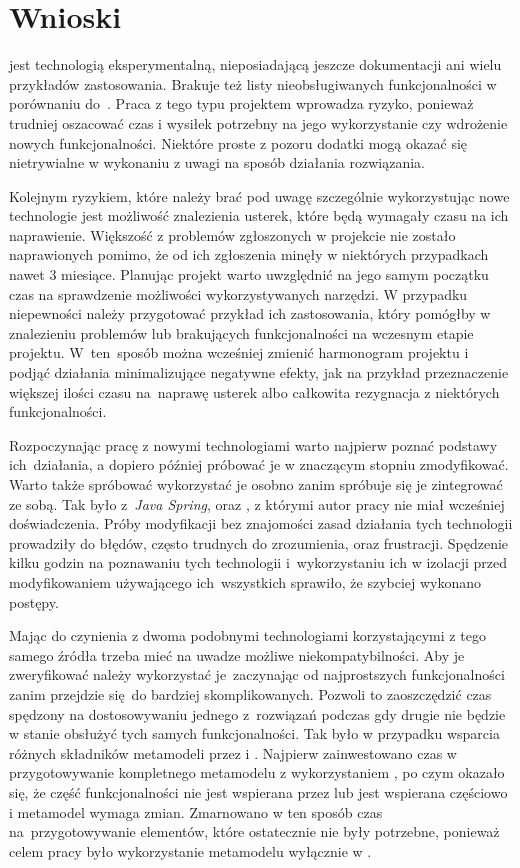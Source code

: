 \section{Wnioski}

\SiriusWeb{} jest technologią eksperymentalną, nieposiadającą jeszcze
dokumentacji ani wielu przykładów zastosowania. Brakuje też listy
nieobsługiwanych funkcjonalności w porównaniu do~\SiriusDesktop{}. Praca z
tego typu projektem wprowadza ryzyko, ponieważ trudniej oszacować czas
i wysiłek potrzebny na jego wykorzystanie czy wdrożenie nowych funkcjonalności.
Niektóre proste z pozoru dodatki mogą okazać się nietrywialne w wykonaniu z
uwagi na sposób działania rozwiązania.

Kolejnym ryzykiem, które należy brać pod uwagę szczególnie wykorzystując nowe
technologie jest możliwość znalezienia usterek, które będą wymagały czasu na
ich naprawienie. Większość z problemów zgłoszonych w projekcie \SiriusWeb{}
nie zostało naprawionych pomimo, że od ich zgłoszenia minęły w niektórych
przypadkach nawet 3 miesiące. Planując projekt warto uwzględnić na jego samym
początku czas na sprawdzenie możliwości wykorzystywanych narzędzi. W przypadku
niepewności należy przygotować przykład ich zastosowania, który pomógłby w
znalezieniu problemów lub brakujących funkcjonalności na wczesnym etapie
projektu. W~ten~sposób można wcześniej zmienić harmonogram projektu i podjąć
działania minimalizujące negatywne efekty, jak na przykład przeznaczenie
większej ilości czasu na~naprawę usterek albo całkowita rezygnacja z niektórych
funkcjonalności.

Rozpoczynając pracę z nowymi technologiami warto najpierw poznać podstawy
ich~działania, a dopiero później próbować je w znaczącym stopniu zmodyfikować.
Warto także spróbować wykorzystać je osobno zanim spróbuje się je
zintegrować ze sobą. Tak było z~\emph{Java Spring}, \Maven{} oraz
\EMF{}, z którymi autor pracy nie miał wcześniej doświadczenia. Próby
modyfikacji bez znajomości zasad działania tych technologii prowadziły do
błędów, często trudnych do zrozumienia, oraz frustracji. Spędzenie kilku godzin
na poznawaniu tych technologii i~wykorzystaniu ich w izolacji przed
modyfikowaniem \SiriusWeb{} używającego ich~wszystkich sprawiło, że
szybciej wykonano postępy.

Mając do czynienia z dwoma podobnymi technologiami korzystającymi z tego samego
źródła trzeba mieć na uwadze możliwe niekompatybilności. Aby je zweryfikować
należy wykorzystać je~zaczynając od najprostszych funkcjonalności zanim
przejdzie się do
bardziej skomplikowanych. Pozwoli to zaoszczędzić czas spędzony na
dostosowywaniu jednego z~rozwiązań podczas gdy drugie nie będzie w stanie
obsłużyć tych samych funkcjonalności. Tak było w przypadku wsparcia różnych
składników metamodeli \EMF{} przez \SiriusDesktop{} i \SiriusWeb{}. Najpierw
zainwestowano czas w przygotowywanie kompletnego
metamodelu z
wykorzystaniem \SiriusDesktop{}, po czym okazało się, że część
funkcjonalności nie jest wspierana przez \SiriusWeb{} lub jest wspierana
częściowo i metamodel wymaga zmian. Zmarnowano w ten sposób czas
na~przygotowywanie elementów, które ostatecznie nie były potrzebne, ponieważ
celem
pracy było wykorzystanie metamodelu wyłącznie w \SiriusWeb{}.

